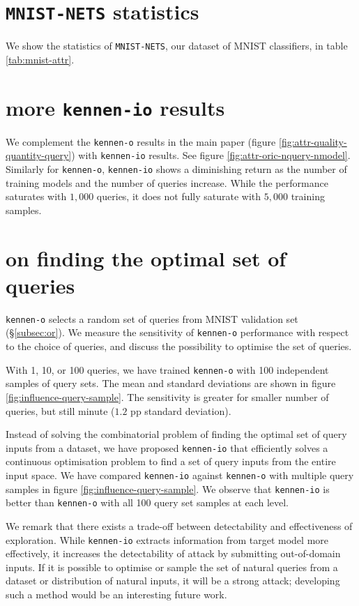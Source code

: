 \documentclass{article} %
\newcommand{\metamnist}{\texttt{MNIST-NETS}\xspace}
\newcommand{\OR}{\texttt{kennen-o}\xspace}
\newcommand{\ORIC}{\texttt{kennen-io}\xspace}
\begin{document}
\section{\metamnist statistics}

We show the statistics of \metamnist, our dataset of MNIST classifiers, in table \ref{tab:mnist-attr}. 


\section{more \ORIC results}

We complement the \OR results in the main paper (figure \ref{fig:attr-quality-quantity-query}) with \ORIC results. See figure \ref{fig:attr-oric-nquery-nmodel}. Similarly for \OR, \ORIC shows a diminishing return as the number of training models and the number of queries increase. While the performance saturates with $1,000$ queries, it does not fully saturate with $5,000$ training samples.

\section{on finding the optimal set of queries}
\label{appendix:optimal-queries}

\OR selects a random set of queries from MNIST validation set  (\S\ref{subsec:or}). We measure the sensitivity of \OR performance with respect to the choice of queries, and discuss the possibility to optimise the set of queries.

With 1, 10, or 100 queries, we have trained \OR with 100 independent samples of query sets. The mean and standard deviations are shown in figure \ref{fig:influence-query-sample}. The sensitivity is greater for smaller number of queries, but still minute ($1.2$ pp standard deviation). 

Instead of solving the combinatorial problem of finding the optimal set of query inputs from a dataset, we have proposed \ORIC that efficiently solves a continuous optimisation problem to find a set of query inputs from the entire input space. We have compared \ORIC against \OR with multiple query samples in figure \ref{fig:influence-query-sample}. We observe that \ORIC is better than \OR with all 100 query set samples at each level.

We remark that there exists a trade-off between detectability and effectiveness of exploration. While \ORIC extracts information from target model more effectively, it increases the detectability of attack by submitting out-of-domain inputs. If it is possible to optimise or sample the set of natural queries from a dataset or distribution of natural inputs, it will be a strong attack; developing such a method would be an interesting future work.
\end{document}
